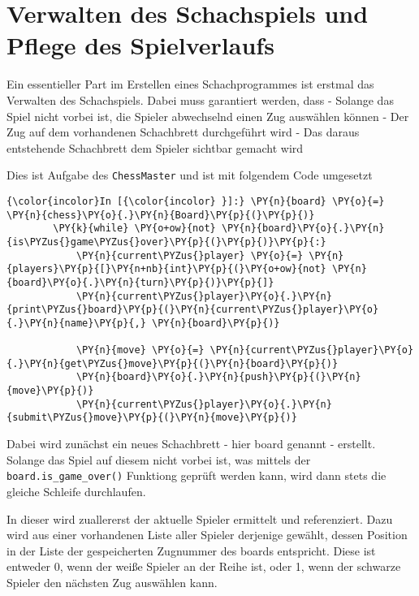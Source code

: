     \section{Verwalten des Schachspiels und Pflege des
Spielverlaufs}\label{verwalten-des-schachspiels-und-pflege-des-spielverlaufs}

Ein essentieller Part im Erstellen eines Schachprogrammes ist erstmal
das Verwalten des Schachspiels. Dabei muss garantiert werden, dass -
Solange das Spiel nicht vorbei ist, die Spieler abwechselnd einen Zug
auswählen können - Der Zug auf dem vorhandenen Schachbrett durchgeführt
wird - Das daraus entstehende Schachbrett dem Spieler sichtbar gemacht
wird

Dies ist Aufgabe des \texttt{ChessMaster} und ist mit folgendem Code
umgesetzt

    \begin{Verbatim}[commandchars=\\\{\}]
{\color{incolor}In [{\color{incolor} }]:} \PY{n}{board} \PY{o}{=} \PY{n}{chess}\PY{o}{.}\PY{n}{Board}\PY{p}{(}\PY{p}{)}
        \PY{k}{while} \PY{o+ow}{not} \PY{n}{board}\PY{o}{.}\PY{n}{is\PYZus{}game\PYZus{}over}\PY{p}{(}\PY{p}{)}\PY{p}{:}
            \PY{n}{current\PYZus{}player} \PY{o}{=} \PY{n}{players}\PY{p}{[}\PY{n+nb}{int}\PY{p}{(}\PY{o+ow}{not} \PY{n}{board}\PY{o}{.}\PY{n}{turn}\PY{p}{)}\PY{p}{]}
            \PY{n}{current\PYZus{}player}\PY{o}{.}\PY{n}{print\PYZus{}board}\PY{p}{(}\PY{n}{current\PYZus{}player}\PY{o}{.}\PY{n}{name}\PY{p}{,} \PY{n}{board}\PY{p}{)}
        
            \PY{n}{move} \PY{o}{=} \PY{n}{current\PYZus{}player}\PY{o}{.}\PY{n}{get\PYZus{}move}\PY{p}{(}\PY{n}{board}\PY{p}{)}
            \PY{n}{board}\PY{o}{.}\PY{n}{push}\PY{p}{(}\PY{n}{move}\PY{p}{)}
            \PY{n}{current\PYZus{}player}\PY{o}{.}\PY{n}{submit\PYZus{}move}\PY{p}{(}\PY{n}{move}\PY{p}{)}
\end{Verbatim}

    Dabei wird zunächst ein neues Schachbrett - hier board genannt -
erstellt. Solange das Spiel auf diesem nicht vorbei ist, was mittels der
\texttt{board.is\_game\_over()} Funktiong geprüft werden kann, wird dann
stets die gleiche Schleife durchlaufen.

In dieser wird zuallererst der aktuelle Spieler ermittelt und
referenziert. Dazu wird aus einer vorhandenen Liste aller Spieler
derjenige gewählt, dessen Position in der Liste der gespeicherten
Zugnummer des boards entspricht. Diese ist entweder 0, wenn der weiße
Spieler an der Reihe ist, oder 1, wenn der schwarze Spieler den nächsten
Zug auswählen kann.

